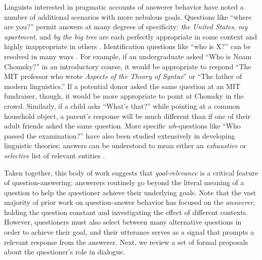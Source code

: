 \documentclass[12pt, floatsintext, jou]{apa6}
\begin{document}

Linguists interested in pragmatic accounts of answerer behavior have noted a number of additional scenarios with more nebulous goals. Questions like ``where are you?'' permit answers at many degrees of specificity: \emph{the United States}, \emph{my apartment}, and \emph{by the big tree} are each perfectly appropriate in some context and highly inappropriate in others \cite{Potts12_CardsDialogueCorpus}. Identification questions like ``who is X?'' can be resolved in many ways  \cite{BoerLycan75_KnowingWho, Gerbrandy00_Identity, Aloni05_ConceptualCovers}. 
For example, if an undergraduate asked ``Who is Noam Chomsky?'' in an introductory course, it would be appropriate to respond ``The MIT professor who wrote \emph{Aspects of the Theory of Syntax}'' or ``The father of modern linguistics.'' If a potential donor asked the same question at an MIT fundraiser, though, it would be more appropriate to point at Chomsky in the crowd. 
Similarly, if a child asks ``What's that?'' while pointing at a common household object, a parent's response will be much different than if one of their adult friends asked the same question. More specific \emph{wh}-questions like ``Who passed the examination?'' have also been studied extensively in developing linguistic theories: answers can be understood to mean either an \emph{exhaustive} or \emph{selective} list of relevant entities \cite{SchulzVanRooij06_ExhaustiveInterpretation}.

Taken together, this body of work suggests that \emph{goal-relevance} is a critical feature of question-answering: answerers routinely go beyond the literal meaning of a question to help the questioner achieve their underlying goals. Note that the vast majority of prior work on question-answer behavior has focused on the \emph{answerer}, holding the question constant and investigating the effect of different contexts. 
However, questioners must also select between many alternative questions in order to achieve their goal, and their utterance serves as a signal that prompts a relevant response from the answerer. Next, we review a set of formal proposals about the questioner's role in dialogue.  
\end{document}
